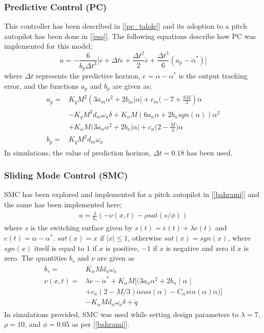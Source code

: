 \documentclass[conference]{IEEEtran}
\begin{document}
		\subsubsection{Predictive Control (PC)} 
		This controller has been described in [\ref{pc_talole}] and its adoption to a pitch autopilot has been done in [\ref{eso}]. The following equations describe how PC was implemented for this model;
		\begin{equation}
			u = - \frac{6}{b_p \Delta t^3} \Big[ e + \Delta t\dot{e} + \frac{\Delta t^2}{2}\ddot{e} + \frac{\Delta t^3}{6}(a_p - \dddot{\alpha}^*) \Big] \nonumber
		\end{equation}
		where $\Delta t$ represents the predictive horizon, $e = \alpha - \alpha^*$ is the output tracking error, and the functions $a_p$ and $b_p$ are given as;
		\begin{eqnarray}
			\begin{aligned}
				a_p =& K_qM^2(3a_m\alpha^2+2b_m|\alpha|+c_m\big(-7+\frac{8M}{3})\dot{\alpha} \\ 
				&-K_qM^2d_m\omega_a\delta+K_\alpha M(6a_n\alpha+2b_nsgn(\alpha))\dot{\alpha^2}\\ &+K_\alpha M(3a_n\alpha^2+2b_n|\alpha|+c_n\Big(2-\frac{M}{3}\Big)\ddot{\alpha} \\
				b_p =& K_q M^2d_m\omega_a \nonumber
			\end{aligned}
		\end{eqnarray}		
		In simulations, the value of prediction horizon, $\Delta t = 0.18$ has been used.
		
		\subsubsection{Sliding Mode Control (SMC)}
		SMC has been explored and implemented for a pitch autopilot in [\ref{bahrami}] and the same has been implemented here;
		\begin{eqnarray}
			u = \frac{1}{b_s} ( -\nu(x,t) -\rho sat(s/\phi)) \nonumber
		\end{eqnarray}
		where $s$ is the switching surface given by $s(t) = \dot{e}(t) + \lambda e(t)$ and $e(t) = \alpha - \alpha^*$. $sat(x) = x$ if $|x| \leq 1$, otherwise $sat(x) = sgn(x)$, where $sgn(x)$ itself is equal to $1$ if $x$ is positive, $-1$ if $x$ is negative and zero if $x$ is zero. The quantities $b_s$ and $\nu$ are given as
		\begin{eqnarray}
		\begin{aligned}
		b_s =& K_\alpha M d_n \omega_a	\\
		\nu(x, t) =& \lambda \dot{e} - \ddot{\alpha}^* + K_\alpha M [(3a_n \alpha^2 + 2b_n \mid\alpha\mid \\	
		\quad &+ c_n(2 - M/3)\dot{\alpha} cos(\alpha) - C_n sin(\alpha)\dot{\alpha} )] \\	
		\quad &- K_\alpha M d_n \omega_a \delta + \dot{q} \nonumber
		\end{aligned}
		\end{eqnarray}
		In simulations provided, SMC was used while setting design parameters to $\lambda = 7$, $\rho = 10$, and $\phi = 0.05$ as per [\ref{bahrami}].
		
\end{document}
